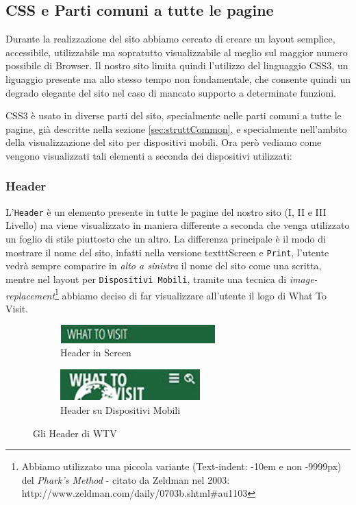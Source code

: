 \subsection{CSS e Parti comuni a tutte le pagine}
Durante la realizzazione del sito abbiamo cercato di creare un layout semplice, accessibile, utilizzabile ma sopratutto visualizzabile al meglio sul maggior numero possibile di Browser. Il nostro sito limita quindi l'utilizzo del linguaggio CSS3, un liguaggio presente ma allo stesso tempo non fondamentale, che consente quindi un degrado elegante del sito nel caso di mancato supporto a determinate funzioni.

CSS3 è usato in diverse parti del sito, specialmente nelle parti comuni a tutte le pagine, già descritte nella sezione \ref{sec:struttCommon}, e specialmente nell'ambito della visualizzazione del sito per dispositivi mobili. Ora però vediamo come vengono visualizzati tali elementi a seconda dei dispositivi utilizzati:

\subsubsection{Header}\label{sec:Pres-Header}
L'\texttt{Header} è un elemento presente in tutte le pagine del nostro sito
(I, II e III Livello) ma viene visualizzato in maniera differente a seconda
che venga utilizzato un foglio di stile piuttosto che un altro. La differenza
principale è il modo di mostrare il nome del sito, infatti nella versione 
texttt{Screen} e \texttt{Print}, l'utente vedrà sempre comparire in
\textit{alto a sinistra} il nome del sito come una scritta, mentre nel layout
per \texttt{Dispositivi Mobili}, tramite una tecnica di
\textit{image-replacement}\footnote{Abbiamo utilizzato una piccola variante
(Text-indent: -10em e non -9999px) del \textit{Phark's Method} - citato da
Zeldman nel 2003: http://www.zeldman.com/daily/0703b.shtml\#au1103} abbiamo
deciso di far visualizzare all'utente il logo di What To Visit.
\begin{figure}[h!]
  \centering
  \begin{subfigure}[b]{0.3\textwidth}
    \includegraphics[height=0.7cm,width=6cm]{images/pres_header.jpg}
    \caption{Header in Screen}
    \label{fig:Header-screen}
  \end{subfigure}
  \hspace{3cm}
  \begin{subfigure}[b]{0.3\textwidth}
    \includegraphics[height=1.2cm,width=5.4cm]{images/pres_header_m.jpg}
    \caption{Header su Dispositivi Mobili}
    \label{fig:Header-mobile}
  \end{subfigure}
  \caption{Gli Header di WTV}\label{fig:Display-Header}
\end{figure}

